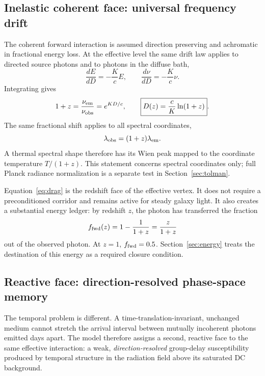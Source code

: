 \documentclass[11pt]{article}
\begin{document}
\subsection{Inelastic coherent face: universal frequency drift}
The coherent forward interaction is assumed direction preserving and achromatic in fractional energy loss. At the effective level the same drift law applies to directed source photons and to photons in the diffuse bath,
\begin{equation}
 \frac{dE}{dD}=-\frac{K}{c}E,
 \qquad
 \frac{d\nu}{dD}=-\frac{K}{c}\nu.
 \label{eq:drag}
\end{equation}
Integrating gives
\begin{equation}
 1+z=\frac{\nu_{\rm em}}{\nu_{\rm obs}}=e^{KD/c},
 \qquad
 \boxed{D(z)=\frac{c}{K}\ln(1+z)}.
 \label{eq:distance}
\end{equation}
The same fractional shift applies to all spectral coordinates,
\begin{equation}
 \lambda_{\rm obs}=(1+z)\lambda_{\rm em}.
\end{equation}
A thermal spectral shape therefore has its Wien peak mapped to the coordinate temperature $T/(1+z)$. This statement concerns spectral coordinates only; full Planck radiance normalization is a separate test in Section~\ref{sec:tolman}.

Equation~\eqref{eq:drag} is the redshift face of the effective vertex. It does not require a preconditioned corridor and remains active for steady galaxy light. It also creates a substantial energy ledger: by redshift $z$, the photon has transferred the fraction
\begin{equation}
 f_{\rm fwd}(z)=1-\frac{1}{1+z}=\frac{z}{1+z}
 \label{eq:fwdloss}
\end{equation}
out of the observed photon. At $z=1$, $f_{\rm fwd}=0.5$. Section~\ref{sec:energy} treats the destination of this energy as a required closure condition.

\subsection{Reactive face: direction-resolved phase-space memory}
The temporal problem is different. A time-translation-invariant, unchanged medium cannot stretch the arrival interval between mutually incoherent photons emitted days apart. The model therefore assigns a second, reactive face to the same effective interaction: a weak, \emph{direction-resolved} group-delay susceptibility produced by temporal structure in the radiation field above its saturated DC background.
\end{document}
